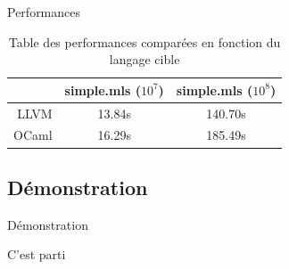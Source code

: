 \documentclass{beamer} %
\begin{document}
\begin{frame}{Performances}
    \begin{table}[h]
        \begin{center}
            \begin{tabular}{|r|c|c|}\hline
                                & simple.mls ($10^7$) & simple.mls ($10^8$) \\ \hline\hline
                          LLVM  & 13.84s              & 140.70s             \\ \hline
                          OCaml & 16.29s              & 185.49s             \\ \hline
            \end{tabular}
            \caption{Table des performances comparées en fonction du langage cible}
        \end{center}
    \end{table}
\end{frame}

\subsection{Démonstration}

\begin{frame}{Démonstration}
    \centerline{C'est parti}
\end{frame}
\end{document}
